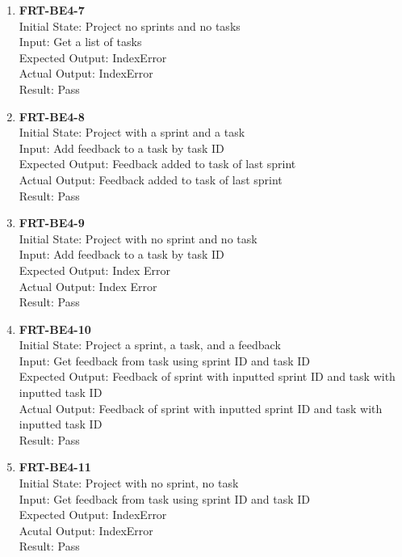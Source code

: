 \documentclass[12pt, titlepage]{article}
\begin{document}
\begin{enumerate}
    \item{\textbf{FRT-BE4-7}}\\
    Initial State: Project no sprints and no tasks\\
    Input: Get a list of tasks\\
    Expected Output: IndexError\\
    Actual Output: IndexError\\
    Result: Pass
    
    \item{\textbf{FRT-BE4-8}}\\
    Initial State: Project with a sprint and a task\\
    Input: Add feedback to a task by task ID\\
    Expected Output: Feedback added to task of last sprint\\
    Actual Output: Feedback added to task of last sprint\\
    Result: Pass
 
    \item{\textbf{FRT-BE4-9}}\\
    Initial State: Project with no sprint and no task\\
    Input: Add feedback to a task by task ID\\
    Expected Output: Index Error\\
    Actual Output: Index Error\\
    Result: Pass
    
    \item{\textbf{FRT-BE4-10}}\\
    Initial State: Project a sprint, a task, and a feedback\\
    Input: Get feedback from task using sprint ID and task ID\\
    Expected Output: Feedback of sprint with inputted sprint ID and task with inputted task ID\\
    Actual Output: Feedback of sprint with inputted sprint ID and task with inputted task ID\\
    Result: Pass
    
    \item{\textbf{FRT-BE4-11}}\\
    Initial State: Project with no sprint, no task\\
    Input: Get feedback from task using sprint ID and task ID\\
    Expected Output: IndexError\\
    Acutal Output: IndexError\\
    Result: Pass
    

\end{enumerate}
\end{document}
